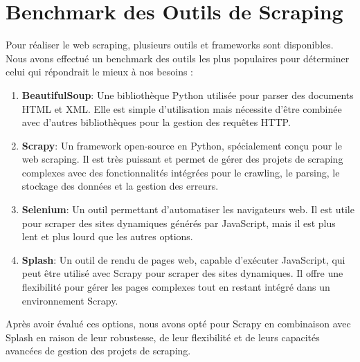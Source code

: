\documentclass[a4paper,12pt]{report}
\numberwithin{equation}{section}
\begin{document}
\section{Benchmark des Outils de Scraping}
\vspace{0.5cm}
\large{
\par Pour réaliser le web scraping, plusieurs outils et frameworks sont disponibles. Nous avons effectué un benchmark des outils les plus populaires pour déterminer celui qui répondrait le mieux à nos besoins :\par
}
\vspace*{0.5cm}
\begin{enumerate}
    \item \large{\textbf{BeautifulSoup}: Une bibliothèque Python utilisée pour parser des documents HTML et XML. Elle est simple d'utilisation mais nécessite d'être combinée avec d'autres bibliothèques pour la gestion des requêtes HTTP. }
    \item \large{\textbf{Scrapy}: Un framework open-source en Python, spécialement conçu pour le web scraping. Il est très puissant et permet de gérer des projets de scraping complexes avec des fonctionnalités intégrées pour le crawling, le parsing, le stockage des données et la gestion des erreurs. }
    \item \large{\textbf{Selenium}: Un outil permettant d'automatiser les navigateurs web. Il est utile pour scraper des sites dynamiques générés par JavaScript, mais il est plus lent et plus lourd que les autres options.}
    \item \large{\textbf{Splash}: Un outil de rendu de pages web, capable d'exécuter JavaScript, qui peut être utilisé avec Scrapy pour scraper des sites dynamiques. Il offre une flexibilité pour gérer les pages complexes tout en restant intégré dans un environnement Scrapy.}
\end{enumerate}
\large{
\par Après avoir évalué ces options, nous avons opté pour Scrapy en combinaison avec Splash en raison de leur robustesse, de leur flexibilité et de leurs capacités avancées de gestion des projets de scraping.
}
\end{document}
